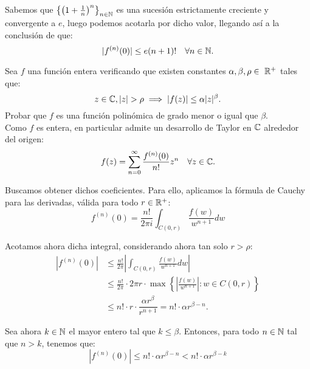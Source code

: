 \begin{ejercicio}
    Sabemos que $\left\{\left(1+\frac{1}{n}\right)^n\right\}_{n\in \mathbb{N}}$ es una sucesión estrictamente creciente y convergente a $e$, luego podemos acotarla por dicho valor, llegando así a la conclusión de que:
    \begin{equation*}
        |f^{(n)}(0)|\leq e(n+1)! \quad \forall n\in \mathbb{N}.
    \end{equation*}
\end{ejercicio}

\begin{ejercicio}
    Sea $f$ una función entera verificando que existen constantes $\alpha,\beta,\rho\in~\mathbb{R}^+$ tales que:
    \begin{equation*}
        z\in \bb{C}, |z|>\rho \implies |f(z)|\leq \alpha |z|^\beta.
    \end{equation*}
    Probar que $f$ es una función polinómica de grado menor o igual que $\beta$.\\

    Como $f$ es entera, en particular admite un desarrollo de Taylor en $\mathbb{C}$ alrededor del origen:
    \begin{equation*}
        f(z)=\sum_{n=0}^{\infty} \dfrac{f^{(n)}(0)}{n!} z^n \quad \forall z\in \mathbb{C}.
    \end{equation*}

    Buscamos obtener dichos coeficientes. Para ello, aplicamos la fórmula de Cauchy para las derivadas, válida para todo $r\in \mathbb{R}^+$:
    \begin{equation*}
        f^{(n)}(0)=\frac{n!}{2\pi i} \int_{C(0,r)} \frac{f(w)}{w^{n+1}} dw
    \end{equation*}

    Acotamos ahora dicha integral, considerando ahora tan solo $r>\rho$:
    \begin{align*}
        |f^{(n)}(0)| &\leq \frac{n!}{2\pi} \left| \int_{C(0,r)} \frac{f(w)}{w^{n+1}} dw \right| \\
        &\leq \frac{n!}{2\pi}\cdot 2\pi r\cdot \max\left\{ \left| \frac{f(w)}{w^{n+1}} \right| : w\in C(0,r) \right\} \\
        &\leq n!\cdot r\cdot \dfrac{\alpha r^\beta}{r^{n+1}} = n!\cdot \alpha r^{\beta-n}.
    \end{align*}

    Sea ahora $k\in \mathbb{N}$ el mayor entero tal que $k\leq \beta$. Entonces, para todo $n\in \mathbb{N}$ tal que $n>k$, tenemos que:
    \begin{equation*}
        |f^{(n)}(0)|\leq n!\cdot \alpha r^{\beta-n}<n!\cdot \alpha r^{\beta-k}
    \end{equation*}


\end{ejercicio}
